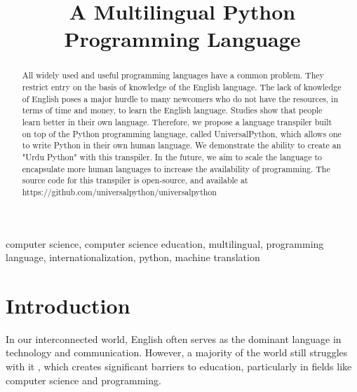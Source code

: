 \documentclass[conference]{IEEEtran}
\begin{document}
\title{A Multilingual Python Programming Language\\
}

\author{
\and
{}
}

\maketitle

\begin{abstract}
  All widely used and useful programming languages have a common problem. They restrict entry on the basis of knowledge of the English language. The lack of knowledge of English poses a major hurdle to many newcomers who do not have the resources, in terms of time and money, to learn the English language. Studies show that people learn better in their own language. Therefore, we propose a language transpiler built on top of the Python programming language, called UniversalPython, which allows one to write Python in their own human language. We demonstrate the ability to create an "Urdu Python" with this transpiler. In the future, we aim to scale the language to encapsulate more human languages to increase the availability of programming. The source code for this transpiler is open-source, and available at https://github.com/universalpython/universalpython
\end{abstract}

\begin{IEEEkeywords}
computer science, computer science education, multilingual, programming language, internationalization, python, machine translation
\end{IEEEkeywords}

\section{Introduction}
In our interconnected world, English often serves as the dominant language in technology and communication. However, a majority of the world still struggles with it \cite{cia_world_factbook_people_and_society}, which creates significant barriers to education, particularly in fields like computer science and programming.
\end{document}
